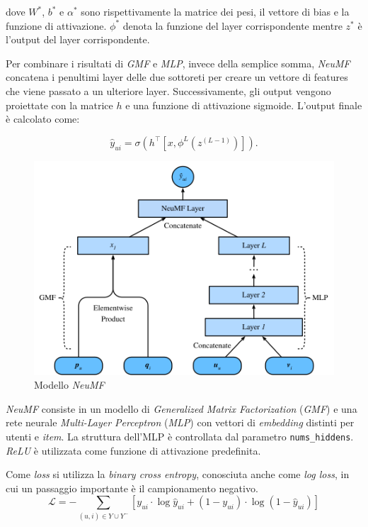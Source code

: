 dove $W^*$, $b^*$ e $\alpha^*$ sono rispettivamente la matrice dei pesi, il vettore di bias e la funzione di attivazione. $\phi^*$ denota la funzione del layer corrispondente mentre $z^*$ è l'output del layer corrispondente.

Per combinare i risultati di \textit{GMF} e \textit{MLP}, invece della semplice somma, \textit{NeuMF} concatena i penultimi layer delle due sottoreti per creare un vettore di features che viene passato a un ulteriore layer. Successivamente, gli output vengono proiettate con la matrice $h$ e una funzione di attivazione sigmoide. L'output finale è calcolato come:

\[
\hat{y}_{ui} = \sigma(h^\top[x, \phi^L(z^{(L-1)})]).
\]

\begin{figure}[H]
    \centering
    \includegraphics[scale=0.6]{figures/algorithms/neu_mf.png}
    \caption{Modello \textit{NeuMF}}
    \label{fig:neu_mf}
\end{figure}

\textit{NeuMF} consiste in un modello di \textit{Generalized Matrix Factorization} (\textit{GMF}) e una rete neurale \textit{Multi-Layer Perceptron} (\textit{MLP}) con vettori di \textit{embedding} distinti per utenti e \textit{item}. La struttura dell'MLP è controllata dal parametro \texttt{nums\_hiddens}. \textit{ReLU} è utilizzata come funzione di attivazione predefinita.

Come \textit{loss} si utilizza la \textit{binary cross entropy}, conosciuta anche come \textit{log loss}, in cui un passaggio importante è il campionamento negativo. 
\[
\mathcal{L} = -\sum_{(u,i) \in Y \cup Y^{-}} \left[ y_{ui} \cdot \log \hat{y}_{ui} + (1 - y_{ui}) \cdot \log(1 - \hat{y}_{ui}) \right]
\]

